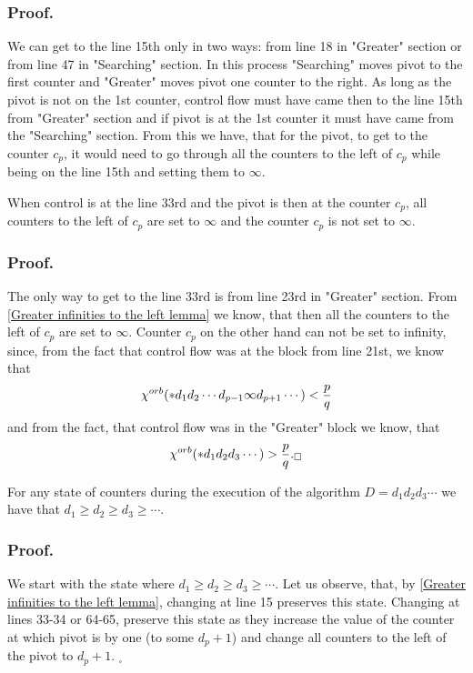 \subsubsection{Proof.}
We can get to the line 15th only in two ways: from line 18 in "Greater" section or from line 47 
in "Searching" section. 
In this process "Searching" moves pivot to the first counter and  
"Greater" moves pivot one counter to the right. 
As long as the pivot is not on the 1st counter, control flow must have came then to the line 15th 
from "Greater" section and if pivot is at the 1st counter it must have came from the 
"Searching" section. From this we have,  
that for the pivot, to get to the counter $c_p$, it would need to go through all 
the counters to the left of $c_p$ while being on the line 15th and 
setting them to $\infty$. 
\begin{lemma}\label{Searching infinities to the left lemma}
When control is at the line 33rd and the pivot is then at the counter $c_p$, all counters 
to the left of $c_p$ are set to $\infty$ and the counter $c_p$ is not set to $\infty$. 
\end{lemma}
\subsubsection{Proof.}
The only way to get to the line 33rd is from line 23rd in "Greater" section. 
From \ref{Greater infinities to the left lemma} we know, that then all the counters to the left 
of $c_p$ are set to $\infty$. Counter $c_p$ on the other hand can not be set to infinity, 
since, from the fact that control flow was at the block from line 21st, we know that
\begin{equation}
{\chi^{orb}(*d_1d_2\cdots d_{p-1}\infty d_{p+1}\cdots)} < \frac{p}{q}
\end{equation}
and from the fact, that control flow was in the "Greater" block we know, that 
\begin{equation}
{\chi^{orb}(*d_1d_2d_3\cdots )} > \frac{p}{q}._\square
\end{equation}

\begin{lemma}\label{state is ordered}
For any state of counters during the execution of the algorithm $D = d_1d_2d_3\cdots$ we have that 
$d_1 \geq d_2\geq d_3 \geq \cdots$.
\end{lemma}
\subsubsection{Proof.}
We start with the state where $d_1 \geq d_2\geq d_3 \geq \cdots$. Let us observe, that, by 
\ref{Greater infinities to the left lemma}, changing at line 15 preserves this state. 
Changing at lines 33-34 or 64-65, preserve this state as they increase
the value of the counter at which pivot is by one (to some $d_p+1$) and change all counters 
to the left of the pivot to $d_p+1$. $_\square$

